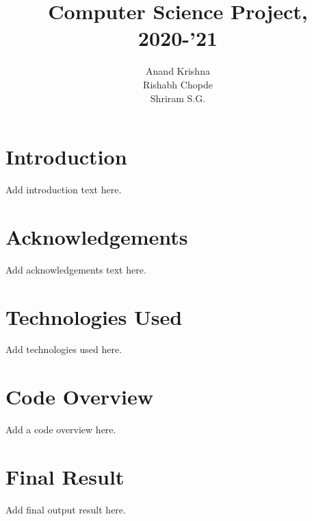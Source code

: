 \documentclass[17pt]{extarticle}
\title{Computer Science Project, 2020-'21}
\author{
    Anand Krishna\\
    \And
    Rishabh Chopde\\
    \And
    Shriram S.G.
    }
\date{\vspace{-5ex}}
\begin{document}
  \maketitle
  \newpage
  \tableofcontents
  
  \newpage
  \section{Introduction}
  Add introduction text here.
  
  \newpage
  \section{Acknowledgements}
  Add acknowledgements text here.
  
  \newpage
  \section{Technologies Used}
  Add technologies used here.
  
  \newpage
  \section{Code Overview}
  Add a code overview here.
  
  \newpage
  \section{Final Result}
  Add final output result here.
  
\end{document}
